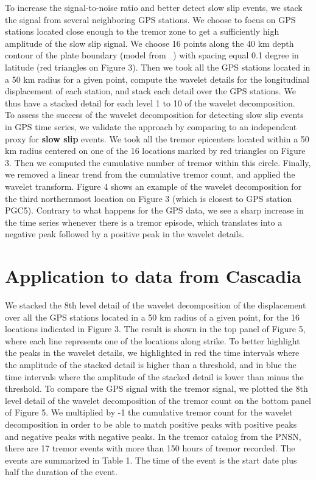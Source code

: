 \documentclass{article}
\begin{document}
To increase the signal-to-noise ratio and better detect slow slip events, we stack the signal from several neighboring GPS stations. We choose to focus on GPS stations located close enough to the tremor zone to get a sufficiently high amplitude of the slow slip signal. We choose 16 points along the 40 km depth contour of the plate boundary (model from ~\citet{PRE_2003}) with spacing equal 0.1 degree in latitude (red triangles on Figure 3). Then we took all the GPS stations located in a 50 km radius for a given point, compute the wavelet details for the longitudinal displacement of each station, and stack each detail over the GPS stations. We thus have a stacked detail for each level 1 to 10 of the wavelet decomposition. \\

To assess the success of the wavelet decomposition for detecting slow slip events in GPS time series, we validate the approach by comparing to an independent proxy for \textbf{slow slip} events. We took all the tremor epicenters located within a 50 km radius centered on one of the 16 locations marked by red triangles on Figure 3. Then we computed the cumulative number of tremor within this circle. Finally, we removed a linear trend from the cumulative tremor count, and applied the wavelet transform. Figure 4 shows an example of the wavelet decomposition for the third northernmost location on Figure 3 (which is closest to GPS station PGC5). Contrary to what happens for the GPS data, we see a sharp increase in the time series whenever there is a tremor episode, which translates into a negative peak followed by a positive peak in the wavelet details.

\section{Application to data from Cascadia}

We stacked the 8th level detail of the wavelet decomposition of the displacement over all the GPS stations located in a 50 km radius of a given point, for the 16 locations indicated in Figure 3. The result is shown in the top panel of Figure 5, where each line represents one of the locations along strike. To better highlight the peaks in the wavelet details, we highlighted in red the time intervals where the amplitude of the stacked detail is higher than a threshold, and in blue the  time intervals where the amplitude of the stacked detail is lower than minus the threshold. To compare the GPS signal with the tremor signal, we plotted the 8th level detail of the wavelet decomposition of the tremor count on the bottom panel of Figure 5. We multiplied by -1 the cumulative tremor count for the wavelet decomposition in order to be able to match positive peaks with positive peaks and negative peaks with negative peaks. In the tremor catalog from the PNSN, there are 17 tremor events with more than 150 hours of tremor recorded. The events are summarized in Table 1. The time of the event is the start date plus half the duration of the event. \\
\end{document}
